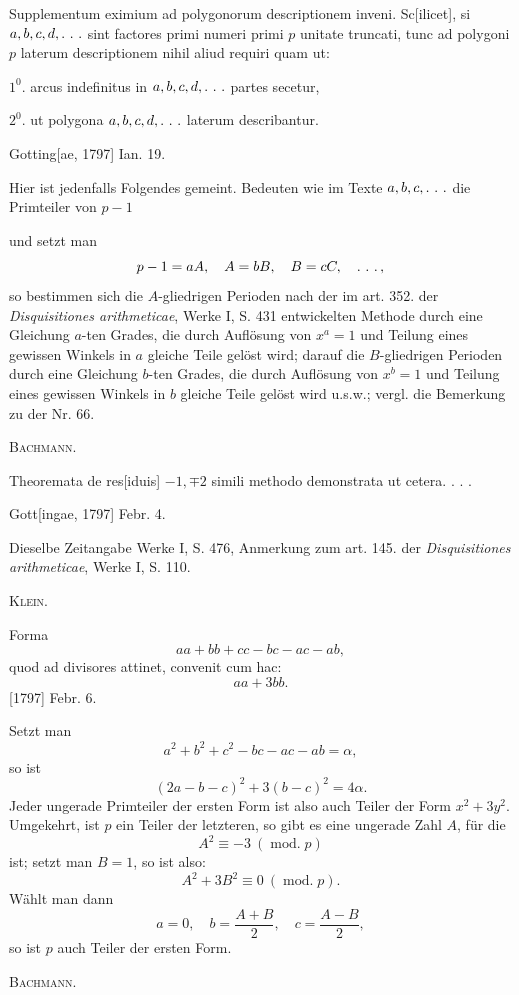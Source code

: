 \indent Supplementum eximium ad polygonorum descriptionem inveni. Sc[ilicet], si \(a,b,c,d,\ldotp\,\ldotp\,\ldotp\) sint factores primi numeri primi \(p\) unitate truncati, tunc ad polygoni \(p\) laterum descriptionem nihil aliud requiri quam ut:
\par\indent \(1^0.\) arcus indefinitus in \(a,b,c,d,\ldotp\,\ldotp\,\ldotp\) partes secetur,
\par\indent \(2^0.\) ut polygona \(a,b,c,d,\ldotp\,\ldotp\,\ldotp\) laterum describantur.
\par\noindent\hfill Gotting[ae, 1797] Ian. 19.

\medskip\begingroup\small
\indent Hier ist jedenfalls Folgendes gemeint. Bedeuten wie im Texte \(a,b,c,\ldotp\,\ldotp\,\ldotp\) die Primteiler von \(p-1\)
\par\endgroup
\clearpage{}
\begingroup\small
\noindent und setzt man
\[
p-1=aA,\quad A=bB,\quad B=cC,\quad\ldotp\,\ldotp\,\ldotp,
\]
\noindent so bestimmen sich die \(A\)-gliedrigen Perioden nach der im art. 352. der \textit{Disquisitiones arithmeticae}, Werke I, S. 431 entwickelten Methode durch eine Gleichung \(a\)-ten Grades, die durch Auflösung von \(x^a=1\) und Teilung eines gewissen Winkels in \(a\) gleiche Teile gelöst wird; darauf die \(B\)-gliedrigen Perioden durch eine Gleichung \(b\)-ten Grades, die durch Auflösung von \(x^b=1\) und Teilung eines gewissen Winkels in \(b\) gleiche Teile gelöst wird u.s.w.; vergl. die Bemerkung zu der Nr. 66.
\par\noindent\hfill\textsc{Bachmann.}
\par\endgroup

\indent Theoremata de res[iduis] \(-1,\mp2\) simili methodo demonstrata ut cetera. . . .
\par\noindent\hfill Gott[ingae, 1797] Febr. 4.

\medskip\begingroup\small
\indent Dieselbe Zeitangabe Werke I, S. 476, Anmerkung zum art. 145. der \textit{Disquisitiones arithmeticae}, Werke I, S. 110.
\par\noindent\hfill\textsc{Klein.}
\par\endgroup

\indent Forma
\[
aa+bb+cc-bc-ac-ab,
\]
\noindent quod ad divisores attinet, convenit cum hac:
\[
aa+3bb.
\]
\noindent\hfill[1797] Febr. 6.

\medskip\begingroup\small
\indent Setzt man
\[
a^2+b^2+c^2-bc-ac-ab=\alpha,
\]
\noindent so ist
\[
(2a-b-c)^2+3(b-c)^2=4\alpha.
\]
\noindent Jeder ungerade Primteiler der ersten Form ist also auch Teiler der Form \(x^2+3y^2\). Umgekehrt, ist \(p\) ein Teiler der letzteren, so gibt es eine ungerade Zahl \(A\), für die
\[
A^2\equiv-3\ (\operatorname{mod.}p)
\]
\noindent ist; setzt man \(B=1\), so ist also:
\[
A^2+3B^2\equiv0\ (\operatorname{mod.}p).
\]
\noindent Wählt man dann
\[
a=0,\quad b=\frac{A+B}{2},\quad c=\frac{A-B}{2},
\]
\noindent so ist \(p\) auch Teiler der ersten Form.
\par\noindent\hfill\textsc{Bachmann.}
\par\endgroup
